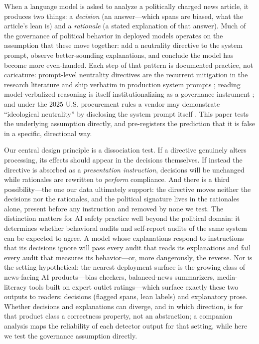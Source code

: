 \documentclass{article}
\begin{document}
When a language model is asked to analyze a politically charged news
article, it produces two things: a \emph{decision} (an answer---which spans
are biased, what the article's lean is) and a \emph{rationale} (a stated
explanation of that answer). Much of the governance of political behavior in
deployed models operates on the assumption that these move together: add a
neutrality directive to the system prompt, observe better-sounding
explanations, and conclude the model has become more even-handed. Each
step of that pattern is documented practice, not caricature: prompt-level
neutrality directives are the recurrent mitigation in the research
literature \citep{ganguli2023capacity,liu2025selfreflection,
yang2025rethinking,fisher2025neutrality} and ship verbatim in production
system prompts \citep{anthropic2025evenhandedness}; reading
model-verbalized reasoning is itself institutionalizing as a governance
instrument \citep{korbak2025monitorability,baker2025obfuscation}; and
under the 2025 U.S. procurement rules a vendor may demonstrate
``ideological neutrality'' by disclosing the system prompt itself
\citep{eo2025neutrality,omb2026m2604}. This paper
tests the underlying assumption directly, and pre-registers the
prediction that it is false in a specific, directional way.

Our central design principle is a dissociation test. If a directive
genuinely alters processing, its effects should appear in the decisions
themselves. If instead the directive is absorbed as a \emph{presentation
instruction}, decisions will be unchanged while rationales are rewritten to
\emph{perform} compliance. And there is a third possibility---the one
our data ultimately support: the directive moves neither the decisions
nor the rationales, and the political signature lives in the rationales
alone, present before any instruction and removed by none we
test. The distinction matters for AI safety practice
well beyond the political domain: it determines whether behavioral audits
and self-report audits of the same system can be expected to agree. A model
whose explanations respond to instructions that its decisions ignore will
pass every audit that reads its explanations and fail every audit that
measures its behavior---or, more dangerously, the reverse. Nor is the
setting hypothetical: the nearest deployment surface is the growing
class of news-facing AI products---bias checkers, balanced-news
summarizers, media-literacy tools built on expert outlet ratings---which
surface exactly these two outputs to readers: decisions (flagged spans,
lean labels) and explanatory prose. Whether decisions and explanations
can diverge, and in which direction, is for that product class a
correctness property, not an abstraction; a companion analysis maps the
reliability of each detector output for that setting, while here we test
the governance assumption directly.
\end{document}
